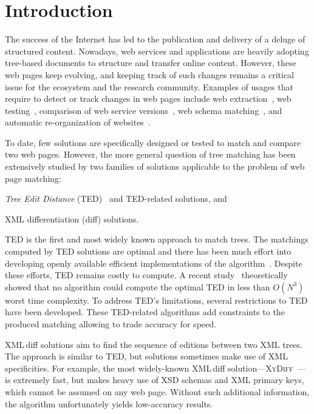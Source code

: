\section{Introduction} 
The success of the Internet has led to the publication and delivery of a deluge of structured content.
Nowadays, web services and applications are heavily adopting tree-based documents to structure and transfer online content.
However, these web pages keep evolving, and keeping track of such changes remains a critical issue for the ecosystem and the research community.
Examples of usages that require to detect or track changes in web pages include web extraction~\cite{reis2004automatic,yao2013answer,zhai2005web}, web testing~\cite{choudhary2011water,stocco2017apogen}, comparison of web service versions~\cite{fokaefs2011empirical}, web schema matching~\cite{hao2007web}, and automatic re-organization of websites~\cite{Kumar2011_Bricolage}.

To date, few solutions are specifically designed or tested to match and compare two web pages.
However, the more general question of tree matching has been extensively studied by two families of solutions applicable to the problem of web page matching: 
\begin{inparaenum}
\item \emph{Tree Edit Distance} (TED)~\cite{Tai1979} and TED-related solutions, and
\item XML differentiation (diff) solutions.
\end{inparaenum}

TED is the first and most widely known approach to match trees.
The matchings computed by TED solutions are optimal and there has been much effort into developing openly available efficient implementations of the algorithm~\cite{Pawlik2011,pawlik2015efficient,pawlik2016tree}.
Despite these efforts, TED remains costly to compute. A recent study~\cite{bringmann2018tree} theoretically showed that no algorithm could compute the optimal TED in less than $O(N^3)$ worst time complexity.
To address TED's limitations, several restrictions to TED have been developed. These TED-related algorithms add constraints to the produced matching allowing to trade accuracy for speed.

XML\,diff solutions aim to find the sequence of editions between two XML trees.
The approach is similar to TED, but solutions sometimes make use of XML specificities.
For example, the most widely-known XML\,diff solution---\textsc{XyDiff}~\cite{Cobena2002DetectingDocuments}---is extremely fast, but makes heavy use of XSD schemas and XML primary keys, which cannot be assumed on any web page.
Without such additional information, the algorithm unfortunately yields low-accuracy results.

